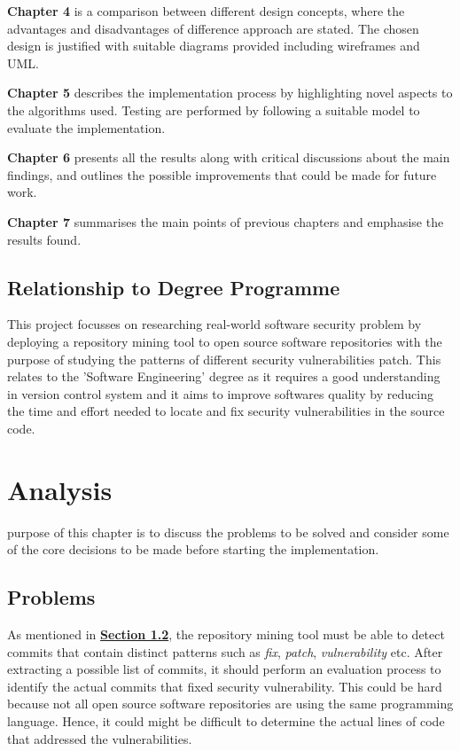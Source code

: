 \documentclass[12pt, a4paper]{report}
\begin{document}
\noindent\textbf{Chapter 4} is a comparison between different design concepts, where the advantages
and disadvantages of difference approach are stated. The chosen design is justified with suitable
diagrams provided including wireframes and UML.

\noindent\textbf{Chapter 5} describes the implementation process by highlighting novel aspects to
the algorithms used. Testing are performed by following a suitable model to evaluate the
implementation.

\noindent\textbf{Chapter 6} presents all the results along with critical discussions about the main
findings,	and outlines the possible improvements that could be made for future work.

\noindent\textbf{Chapter 7} summarises the main points of previous chapters and emphasise the
results found.

\section{Relationship to Degree Programme}
This project focusses on researching real-world software security problem by deploying a repository
mining tool to open source software repositories with the purpose of studying the patterns of
different security vulnerabilities patch. This relates to the 'Software Engineering' degree as it
requires a good understanding in version control system and it aims to improve softwares quality by
reducing the time and effort needed to locate and fix security vulnerabilities in the source code.

\chapter{Analysis} %
purpose of this chapter is to discuss the problems to be solved and consider some of the core
decisions to be made before starting the implementation.

\section{Problems}
As mentioned in \hyperref[sec:objectives]{\textbf{Section 1.2}}, the repository mining tool must be
able to detect commits that contain distinct patterns such as \textit{fix}, \textit{patch},
\textit{vulnerability} etc. After extracting a possible list of commits, it should perform an
evaluation process to identify the actual commits that fixed security vulnerability.	This could be
hard because not all open source software repositories are using the same programming language.
Hence, it could might be difficult to determine the actual lines of code that addressed the
vulnerabilities.
\end{document}
